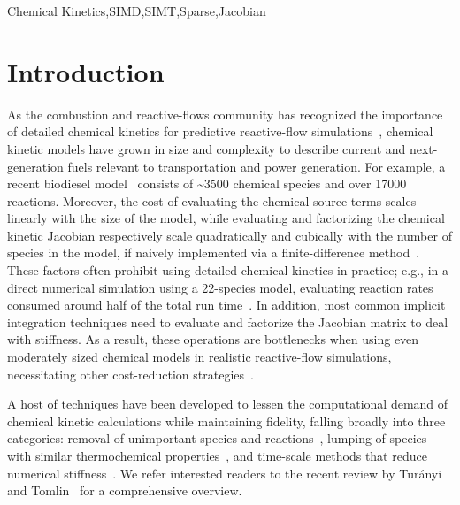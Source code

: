 \documentclass[12pt,number,sort&compress,preprint]{elsarticle}
\newcommand{\revise}[1]{{\sloppy\textcolor{RoyalPurple}{#1}}}  %
\begin{document}
\begin{frontmatter}
\begin{keyword}
    Chemical Kinetics\sep SIMD\sep SIMT\sep Sparse\sep Jacobian
\end{keyword}

\end{frontmatter}

\section{Introduction}
%

\revise{As the combustion and reactive-flows community has recognized the importance of detailed chemical kinetics for predictive reactive-flow simulations~\cite{LU2009192}, chemical kinetic models have grown in size and complexity to describe current and next-generation fuels relevant to transportation and power generation.}
\revise{For example,} a recent biodiesel model~\cite{WESTBROOK2011742} consists of \textasciitilde\num{3500} chemical species and over \num{17000} reactions.
Moreover, the cost of evaluating the chemical source-terms scales linearly with the size of the model, while evaluating and factorizing the chemical kinetic Jacobian respectively scale quadratically and cubically with the number of species in the model, \revise{if naively implemented via a finite-difference method~\cite{LU2009192}}.
These factors often \revise{prohibit using} detailed chemical kinetics in practice; e.g., in a direct numerical simulation \revise{using} a 22-species model, \revise{evaluating} reaction rates consumed around half of the total run time~\cite{Spafford:2010aa}.
\revise{In addition, most common implicit integration techniques need to evaluate and factorize the Jacobian matrix to deal with stiffness.
As a result, these operations are bottlenecks when using even moderately sized chemical models in realistic reactive-flow simulations, necessitating other cost-reduction strategies~\cite{LU2009192}.}

A host of techniques have been developed to lessen the computational demand of chemical kinetic calculations while maintaining fidelity, \revise{falling} broadly into \revise{three} categories: removal of unimportant species and reactions~\cite{Lu:2006bb,Pepiot-Desjardins:2008,Hiremath:2010jw,Niemeyer:2010bt,Curtis:2015},
lumping of species with similar thermochemical properties~\cite{Lu:2007,Ahmed:2007fa,Pepiot:2008kq},
and time-scale methods that reduce numerical stiffness~\cite{Maas:1992ws,Lam:1994ws,Lu:2001ve,Gou:2010}.
\revise{We refer interested readers} to the recent review by Tur\'anyi and Tomlin~\cite{turanyi2016analysis} for a comprehensive overview.
\end{document}
